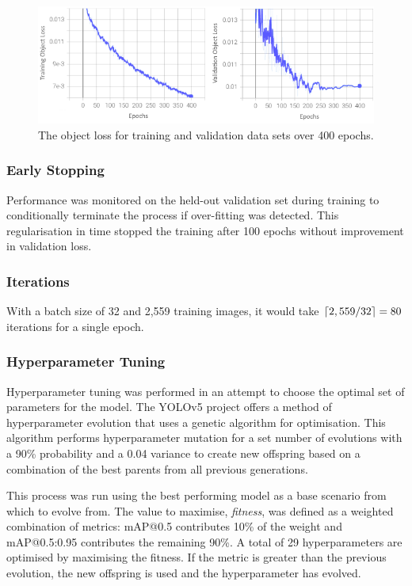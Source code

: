 \documentclass{thesis}
\begin{document}
\begin{figure}[h]
    \centering
    \includegraphics[scale=0.75]{images/train-val-obj-loss.png}
    \caption{The object loss for training and validation data sets over 400 epochs.}
    \label{fig:epochs}
\end{figure}

\subsubsection{Early Stopping}

Performance was monitored on the held-out validation set during training to conditionally terminate the process if over-fitting was detected. This regularisation in time stopped the training after 100 epochs without improvement in validation loss.

\subsubsection{Iterations} 

With a batch size of 32 and 2,559 training images, it would take $\lceil2,559 / 32\rceil = 80$ iterations for a single epoch.

\subsubsection{Hyperparameter Tuning}

Hyperparameter tuning was performed in an attempt to choose the optimal set of parameters for the model. The YOLOv5 project offers a method of hyperparameter evolution that uses a genetic algorithm for optimisation. This algorithm performs hyperparameter mutation for a set number of evolutions with a 90\% probability and a 0.04 variance to create new offspring based on a combination of the best parents from all previous generations. 

This process was run using the best performing model as a base scenario from which to evolve from. The value to maximise, \textit{fitness}, was defined as a weighted combination of metrics: mAP@0.5 contributes 10\% of the weight and mAP@0.5:0.95 contributes the remaining 90\%. A total of 29 hyperparameters are optimised by maximising the fitness. If the metric is greater than the previous evolution, the new offspring is used and the hyperparameter has evolved. 
\end{document}
